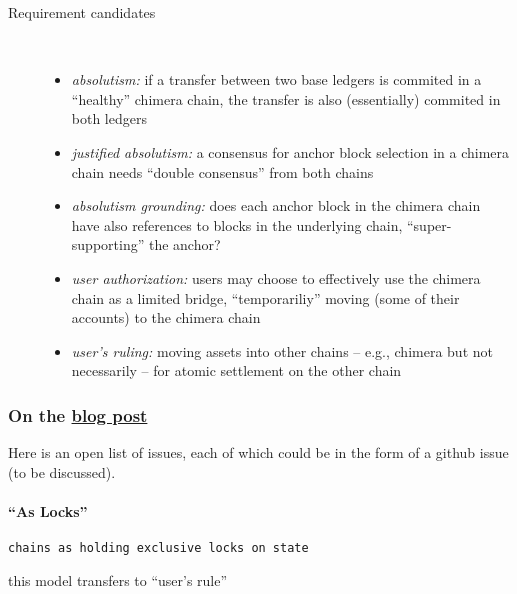 \documentclass{article}
\theoremstyle{definition}
\begin{document}
\begin{description}
\item[Requirement candidates]~\\
  \begin{itemize}
  \item
    \emph{absolutism:}
    if a transfer between two base ledgers is commited
    in a “healthy” chimera chain, 
    the transfer is also (essentially) commited in both ledgers
  \item 
    \emph{justified absolutism:}
    a consensus for anchor block selection in a chimera chain
    needs “double consensus” from both chains 
    
  \item
    \emph{absolutism grounding:}
    does each anchor block in the chimera chain
    have also references to blocks in the underlying chain, 
    “super-supporting” the anchor?

  \item
    \emph{user authorization:}
    users may choose to effectively use
    the chimera chain as a limited bridge,
    “temporariliy” moving (some of their accounts)
    to the chimera chain
  \item
    \emph{user's ruling:}
    moving assets into other chains
    -- e.g., chimera but not necessarily --
    for atomic settlement on the other chain

    
  \end{itemize}
\end{description}

\subsubsection{On the %
  \href{https://anoma.net/blog/heterogeneous-paxos-and-multi-chain-atomic-commits/}{%
    blog post%
  }
}
\label{sec:blog-post-discussion}

Here is an open list of issues,
each of which could be in the form of a github issue (to be discussed). 

\paragraph{“As Locks”}

\texttt{chains as holding exclusive locks on state}

this model transfers to “user's rule”
\end{document}

